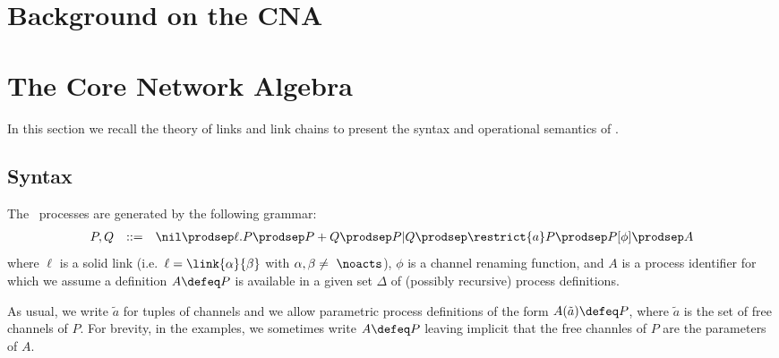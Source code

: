 

\section{Background on the CNA}



\section{The Core Network Algebra}
\label{sec:network}

In this section we recall the theory of links and link chains to present the syntax and operational semantics of \CNA.


\subsection{Syntax}

\begin{definition}
The \CNA\ processes are generated by the following grammar:
\[
\begin{array}{rcl}
P,Q & ::= &
\nil \prodsep
\ell. P  \prodsep
P+Q \prodsep
P|Q \prodsep
\restrict{a} P \prodsep
P[\phi] \prodsep
A
\end{array}
\]
\noindent
where $\ell$ is a solid link (i.e.\  $\ell = \link{\alpha}{\beta}$ with $\alpha,\beta\neq \ \noacts$),
$\phi$ is a channel renaming function,
and $A$ is a process identifier for which we assume a definition $A \defeq P$ is available in a given set $\Delta$ of (possibly recursive) process definitions.
\end{definition}

As usual, we write $\tilde{a}$ for tuples of channels and we allow parametric process definitions of the form $A(\tilde{a}) \defeq P$,
where $\tilde{a}$ is the set of free channels of $P$.
For brevity, in the examples, we sometimes write $A \defeq P$ leaving implicit that the free channles of $P$ are the parameters of $A$.


